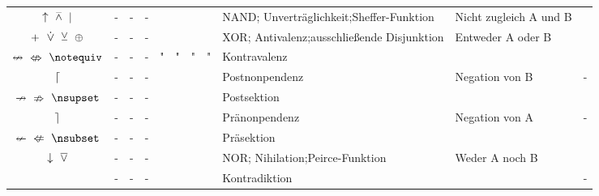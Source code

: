 \documentclass[english,ngerman,parskip=half,headsepline,footsepline]{scrreprt}
\newcommand*{\clq}{'} %
\newcommand*{\crq}{'} %
\newcommand*{\cse}{, } %
\newcommand*{\csp}{\crqt\cset\clqt} %
\newcommand*{\clqt}{} %
\newcommand*{\crqt}{} %
\newcommand*{\cset}{~} %
\newcommand*{\cspt}{\crqt\cset\clqt} %
\begin{document}
\begin{table}
\begin{threeparttable}
\begin{tabularx}{\linewidth-10.95pt}{c||c:cc:cccc|X:X|c|}
				\clqt$\uparrow$\cspt$\barwedge$\cspt$\mid$\crqt &-&-&-&\textfalse&\texttrue&\texttrue&\texttrue& NAND; Unverträglichkeit;\newline Sheffer-Funktion&Nicht zugleich A und B&\thepnand\\
				\tableline %
				\clqt$+$\cspt$\operatorname{\dot\lor}$\cspt$\veebar$\cspt$\oplus$\crqt &-&-&-&\textfalse&\texttrue&\texttrue&\textfalse& XOR; Antivalenz;\newline ausschließende Disjunktion&Entweder A oder B&\thepxor\\
				\gapline %
				\clqt$\nleftrightarrow$\cspt$\nLeftrightarrow$\cspt$\lnequivB$\crqt &-&-&-&"&"&"&"& Kontravalenz&&\thepnequiv\\
				\tableline %
				$\lceil$ &-&-&-&\textfalse&\texttrue&\textfalse&\texttrue& Postnonpendenz&Negation von B&-\\
				\tableline %
				\clqt$\nrightarrow$\cspt$\nRightarrow$\cspt$\lnrightimpB$\crqt &-&-&-&\textfalse&\texttrue&\textfalse&\textfalse& Postsektion&&\thepnrightimp\\
				\tablegroup %

				\clqt$\rceil$\crqt &-&-&-&\textfalse&\textfalse&\texttrue&\texttrue& Pränonpendenz&Negation von A&-\\
				\tableline %
				\clqt$\nleftarrow$\cspt$\nLeftarrow$\cspt$\lnleftimpB$\crqt &-&-&-&\textfalse&\textfalse&\texttrue&\textfalse& Präsektion&&\thepnleftimp\\
				\tableline %
				\clqt$\downarrow$\cspt$\operatorname{\overline\vee}$\crqt &-&-&-&\textfalse&\textfalse&\textfalse&\texttrue& NOR; Nihilation;\newline Peirce-Funktion&Weder A noch B&\thepnor\\
				\tableline %
				~ &-&-&-&\textfalse&\textfalse&\textfalse&\textfalse& Kontradiktion&&-\\
				\hline\hline %


\end{tabularx}
\end{threeparttable}
\end{table}
\end{document}

